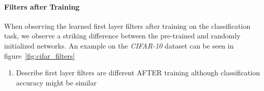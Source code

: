\documentclass{article}
\begin{document}
      \paragraph{Filters after Training}

      When observing the learned first layer filters after training on the classification task, we observe a striking difference between the pre-trained and randomly initialized networks. An example on the \emph{CIFAR-10} dataset can be seen in figure~\ref{fig:cifar_filters}

        \begin{enumerate}
          
          \item{Describe first layer filters are different AFTER training although classification accuracy might be similar}
        \end{enumerate}
\end{document}

